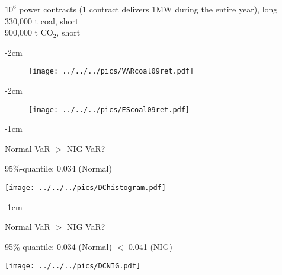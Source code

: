 


	$10^6$ power contracts (1 contract delivers 1MW during the entire year), long \\[-1.5cm]

	330,000 t coal, short\\[-1.5cm]

	900,000 t CO$_2$, short






{-2cm}
\begin{figure}
\begin{center}
\texttt{[image: ../../../pics/VARcoal09ret.pdf]}
\end{center}
\end{figure}

{-2cm}
\begin{figure}
\begin{center}
\texttt{[image: ../../../pics/EScoal09ret.pdf]}
\end{center}
\end{figure}

{-1cm}
\begin{center}
Normal VaR $>$ NIG VaR?
\end{center}
95\%-quantile: \hspace{2cm} 0.034 (Normal) \hspace{1cm}\\
\begin{center}
\texttt{[image: ../../../pics/DChistogram.pdf]}
\end{center}

{-1cm}
\begin{center}
Normal VaR $>$ NIG VaR?
\end{center}
95\%-quantile: \hspace{1cm} 0.034 (Normal)  \hspace{1cm}$<$ \hspace{1cm} 0.041 (NIG)\\
\begin{center}
\texttt{[image: ../../../pics/DCNIG.pdf]}
\end{center}

